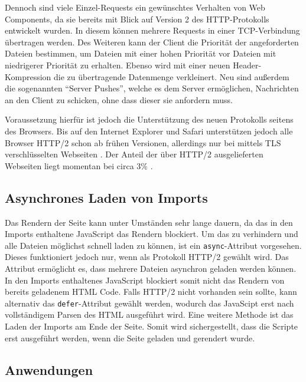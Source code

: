 Dennoch sind viele Einzel-Requests ein gewünschtes Verhalten von Web Components, da sie bereits mit Blick auf Version 2 des \ac{HTTP}-Protokolls entwickelt wurden. In diesem können mehrere Requests in einer \ac{TCP}-Verbindung übertragen werden. Des Weiteren kann der Client die Priorität der angeforderten Dateien bestimmen, um Dateien mit einer hohen Priorität vor Dateien mit niedrigerer Priorität zu erhalten. Ebenso wird mit einer neuen Header-Kompression die zu übertragende Datenmenge verkleinert. Neu sind außerdem die sogenannten ``Server Pushes'', welche es dem Server ermöglichen, Nachrichten an den Client zu schicken, ohne dass dieser sie anfordern muss.

Voraussetzung hierfür ist jedoch die Unterstützung des neuen Protokolls seitens des Browsers. Bis auf den Internet Explorer und Safari unterstützen jedoch alle Browser \ac{HTTP}/2 schon ab frühen Versionen, allerdings nur bei mittels \ac{TLS} verschlüsselten Webseiten \cite{citeulike:13879562}. Der Anteil der über \ac{HTTP}/2 ausgelieferten Webseiten liegt momentan bei circa 3\% \cite{citeulike:13879575}.


\subsection{Asynchrones Laden von Imports}\label{asynchrones-laden-von-imports}

Das Rendern der Seite kann unter Umständen sehr lange dauern, da das in den Imports enthaltene JavaScript das Rendern blockiert. Um das zu verhindern und alle Dateien möglichst schnell laden zu können, ist ein \texttt{async}-Attribut vorgesehen. Dieses funktioniert jedoch nur, wenn als Protokoll \ac{HTTP}/2 gewählt wird. Das Attribut ermöglicht es, dass mehrere Dateien asynchron geladen werden können. In den Imports enthaltenes JavaScript blockiert somit nicht das Rendern von bereits geladenem \ac{HTML} Code. Falls \ac{HTTP}/2 nicht vorhanden sein sollte, kann alternativ das \texttt{defer}-Attribut gewählt werden, wodurch das JavaScipt erst nach vollständigem Parsen des \ac{HTML} ausgeführt wird. Eine weitere Methode ist das Laden der Imports am Ende der Seite. Somit wird sichergestellt, dass die Scripte erst ausgeführt werden, wenn die Seite geladen und gerendert wurde.


\subsection{Anwendungen}\label{anwendungen}

